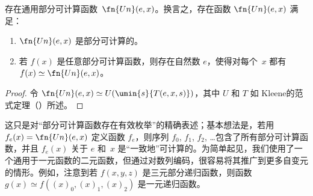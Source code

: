 \documentclass[../../../include/open-logic-section]{subfiles}
\begin{document}

\begin{thm}
存在通用部分可计算函数~$\fn{Un}(e,x)$。换言之，存在函数 $\fn{Un}(e,x)$ 满足：
\begin{enumerate}
\item $\fn{Un}(e,x)$ 是部分可计算的。
\item 若 $f(x)$ 是任意部分可计算函数，则存在自然数 $e$，使得对每个~$x$ 都有 $f(x) \simeq \fn{Un}(e,x)$。
\end{enumerate}
\end{thm}

\begin{proof}
令 $\fn{Un}(e,x) \simeq U(\umin{s}{T(e,x,s)})$，其中 $U$ 和 $T$ 如 Kleene的范式定理（）所述。
\end{proof}

\begin{explain}
这只是对“部分可计算函数存在有效枚举”的精确表述；基本想法是，若用 $f_e(x) = \fn{Un}(e,x)$ 定义函数 $f_e$，则序列 $f_0$, $f_1$, $f_2$, \dots 包含了所有部分可计算函数，并且 $f_e(x)$ 关于 $e$ 和~$x$ 是“一致地”可计算的。为简单起见，我们使用了一个通用于一元函数的二元函数，但通过对数列编码，很容易将其推广到更多自变元的情形。例如，注意到若 $f(x,y,z)$ 是三元部分递归函数，则函数 $g(x) \simeq f((x)_0, (x)_1, (x)_2)$ 是一元递归函数。
\end{explain}
\end{document}
